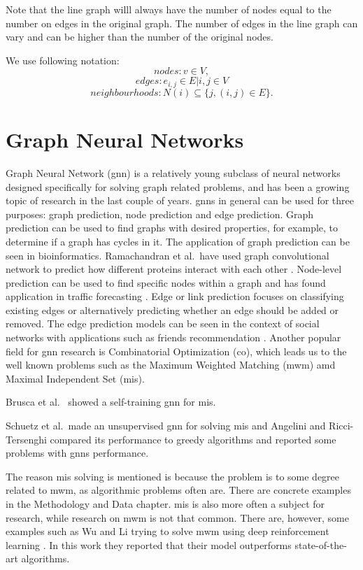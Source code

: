 Note that the line graph willl always have the number of nodes equal to the number on edges in the original graph. The number of edges in the line graph can vary and can be higher than the number of the original nodes.

We use following notation: 
$$nodes: v \in V,$$
$$edges: e_{i,j} \in E | i, j \in V$$
$$neighbourhoods: N(i)\subseteq \{j, (i,j) \in E\}.$$ 

\section{Graph Neural Networks}
\label{sec:graphneuralnetworks}
Graph Neural Network (\gls{gnn}) is a relatively young subclass of neural networks designed specifically for solving graph related problems, and has been a growing topic of research in the last couple of years. \gls{gnn}s in general can be used for three purposes: graph prediction, node prediction and edge prediction. Graph prediction can be used to find graphs with desired properties, for example, to determine if a graph has cycles in it. The application of graph prediction can be seen in bioinformatics. Ramachandran et al.\ have used graph convolutional network to predict how different proteins interact with each other \cite{ramachandran2019protein}. Node-level prediction can be used to find specific nodes within a graph and has found application in traffic forecasting \cite{Yu2018}. Edge or link prediction focuses on classifying existing edges or alternatively predicting whether an edge should be added or removed. The edge prediction models can be seen in the context of social networks with applications such as friends recommendation \cite{ADAMIC2003211}. Another popular field for \gls{gnn} research is Combinatorial Optimization (\gls{co}), which leads us to the well known problems such as the Maximum Weighted Matching (\gls{mwm}) amd Maximal Independent Set (\gls{mis}).

Brusca et al.\ \cite{brusca2023maximum} showed a self-training \gls{gnn} for \gls{mis}. 

Schuetz et al.\ made an unsupervised \gls{gnn} \cite{Schuetz2022} for solving \gls{mis} and Angelini and Ricci-Tersenghi \cite{Angelini2022} compared its performance to greedy algorithms and reported some problems with \gls{gnn}s performance.

The reason \gls{mis} solving is mentioned is because the problem is to some degree related to \gls{mwm}, as algorithmic problems often are. There are concrete examples in the Methodology and Data chapter. \gls{mis} is also more often a subject for research, while research on \gls{mwm} is not that common. There are, however, some examples such as Wu and Li trying to solve \gls{mwm} using deep reinforcement learning \cite{WU2022400}. In this work they reported that their model outperforms state-of-the-art algorithms.

